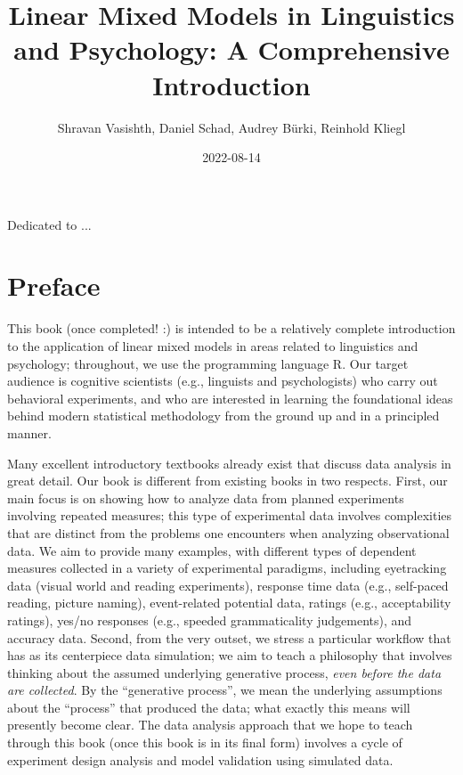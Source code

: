 \documentclass[
  12pt,
]{krantz}
\title{Linear Mixed Models in Linguistics and Psychology: A Comprehensive Introduction}
\author{Shravan Vasishth, Daniel Schad, Audrey Bürki, Reinhold Kliegl}
\date{2022-08-14}
\theoremstyle{definition}
\theoremstyle{definition}
\theoremstyle{definition}
\theoremstyle{definition}
\theoremstyle{remark}
\begin{document}
\maketitle

\thispagestyle{empty}
\begin{center}
Dedicated to ...
\end{center}

\setlength{\abovedisplayskip}{-5pt}
\setlength{\abovedisplayshortskip}{-5pt}

{
\hypersetup{linkcolor=}
\setcounter{tocdepth}{2}
\tableofcontents
}
\hypertarget{preface}{%
\chapter*{Preface}\label{preface}}


This book (once completed! :) is intended to be a relatively complete introduction to the application of linear mixed models in areas related to linguistics and psychology; throughout, we use the programming language R. Our target audience is cognitive scientists (e.g., linguists and psychologists) who carry out behavioral experiments, and who are interested in learning the foundational ideas behind modern statistical methodology from the ground up and in a principled manner.

Many excellent introductory textbooks already exist that discuss data analysis in great detail. Our book is different from existing books in two respects. First, our main focus is on showing how to analyze data from planned experiments involving repeated measures; this type of experimental data involves complexities that are distinct from the problems one encounters when analyzing observational data. We aim to provide many examples, with different types of dependent measures collected in a variety of experimental paradigms, including
eyetracking data (visual world and reading experiments), response time data (e.g., self-paced reading, picture naming), event-related potential data, ratings (e.g., acceptability ratings), yes/no responses (e.g., speeded grammaticality judgements), and accuracy data. Second, from the very outset, we stress a particular workflow that has as its centerpiece data simulation; we aim to teach a philosophy that involves thinking about the assumed underlying generative process, \emph{even before the data are collected}. By the ``generative process'', we mean the underlying assumptions about the ``process'' that produced the data; what exactly this means will presently become clear.
The data analysis approach that we hope to teach through this book (once this book is in its final form) involves a cycle of experiment design analysis and model validation using simulated data.
\end{document}
